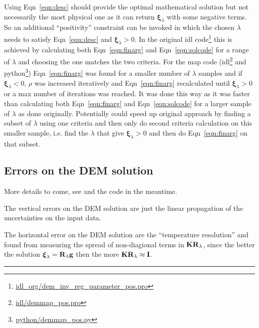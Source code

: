 \documentclass[12pt,a4paper]{article}
\begin{document}
Using Eqn~\ref{eqn:desc} should provide the optimal mathematical solution but not necessarily the most physical one as it can return $\boldsymbol{\xi}_\lambda$ with some negative terms. So an additional ``positivity'' constraint can be invoked in which the chosen $\lambda$ needs to satisfy Eqn~\ref{eqn:desc} and $\boldsymbol{\xi}_\lambda >0$. In the original idl code\footnote{\href{https://github.com/ianan/demreg/blob/master/idl_org/dem_inv_reg_parameter_pos.pro}{idl\_org/dem\_inv\_reg\_parameter\_pos.pro}} this is achieved by calculating both Eqn~\ref{eqn:finarg} and Eqn~\ref{eqn:solcode} for a range of $\lambda$ and choosing the one matches the two criteria. For the map code (idl\footnote{\href{https://github.com/ianan/demreg/blob/master/idl/demmap_pos.pro}{idl/demmap\_pos.pro}} and python\footnote{\href{https://github.com/ianan/demreg/blob/master/python/demmap_pos.py}{python/demmap\_pos.py}}) Eqn~\ref{eqn:finarg} was found for a smaller number of $\lambda$ samples and if $\boldsymbol{\xi}_\lambda <0$, $\rho$ was increased iteratively and Eqn~\ref{eqn:finarg} recalculated until $\boldsymbol{\xi}_\lambda >0$ or a max number of iterations was reached. It was done this way as it was faster than calculating both Eqn~\ref{eqn:finarg} and Eqn~\ref{eqn:solcode} for a larger sample of $\lambda$ as done originally. Potentially could speed up original approach by finding a subset of $\lambda$ using one criteria and then only do second criteria calculation on this smaller sample, i.e. find the $\lambda$ that give $\boldsymbol{\xi}_\lambda > 0$ and then do Eqn~\ref{eqn:finarg} on that subset.

\subsection*{Errors on the DEM solution}

More details to come, see \citet{2012A&A...539A.146H,2013A&A...553A..10H} and the code in the meantime.

The vertical errors on the DEM solution are just the linear propagation of the uncertainties on the input data.

The horizontal error on the DEM solution are the ``temperature resolution'' and found from measuring the spread of non-diagional terms in ${\bf K R_\lambda}$, since the better the solution $\boldsymbol{\xi}_\lambda = {\bf R}_\lambda {\bf g}$ then the more ${\bf K R_\lambda} \approx {\bf I}$.

\par\noindent\rule{0.5\textwidth}{0.4pt}
\end{document}
